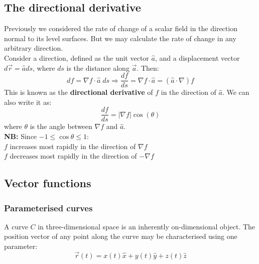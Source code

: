 \documentclass[11pt]{article}
\begin{document}
    \subsection{The directional derivative}\label{subsec:the-directional-derivative}
    Previously we considered the rate of change of a scalar field in the direction normal to its level surfaces.
    But we may calculate the rate of change in any arbitrary direction.\\
    Consider a direction, defined as the unit vector $\hat{a}$, and a displacement vector $d\vec{r} = \hat{a} ds$, where
    $ds$ is the distance along $\vec{a}$.
    Then:
    \begin{equation}
        \label{eq:equation4}
        df = \nabla f \cdot \hat{a} \; ds \Rightarrow \frac{df}{ds} = \nabla f \cdot \hat{a} = (\hat{a} \cdot \nabla) f
    \end{equation}
    This is known as the \textbf{directional derivative} of $f$ in the direction of $\hat{a}$.
    We can also write it as:
    \begin{equation}
        \label{eq:equation5}
        \frac{df}{ds} = | \nabla f | \cos (\theta)
    \end{equation}
    where $\theta$ is the angle between $\nabla f$ and $\hat{a}$.\\
    \textbf{NB:} Since $-1 \leq \cos \theta \leq 1$:\\
    \textbullet $f$ increases most rapidly in the direction of $\nabla f$\\
    \textbullet $f$ decreases most rapidly in the direction of $-\nabla f$

    \subsection{Vector functions}\label{subsec:vector-functions}
    \subsubsection{Parameterised curves}
    A curve $C$ in three-dimensional space is an inherently on-dimensional object.
    The position vector of any point along the curve may be characterised using one parameter:
    \begin{equation}
        \label{eq:equation6}
        \vec{r}(t) = x(t)\hat{x} + y(t)\hat{y} + z(t)\hat{z}
    \end{equation}
\end{document}
